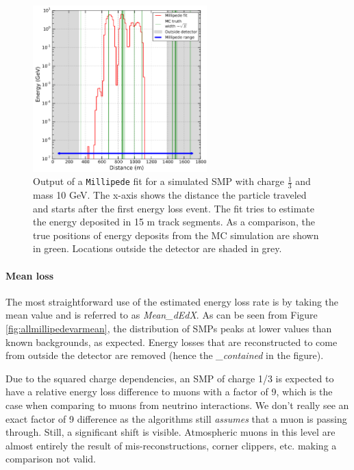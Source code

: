 \begin{figure}
\centering
\includegraphics[width=0.6\textwidth]{chapter8/img/millipedeStef.png}
\caption{Output of a \texttt{Millipede} fit for a simulated SMP with charge $\frac{1}{3}$ and mass 10 GeV. The x-axis shows the distance the particle traveled and starts after the first energy loss event. The fit tries to estimate the energy deposited in 15 m track segments. As a comparison, the true positions of energy deposits from the MC simulation are shown in green. Locations outside the detector are shaded in grey.}
\label{fig:millipedeoutput}
\end{figure}

\paragraph{Mean loss}
The most straightforward use of the estimated energy loss rate is by taking the mean value and is referred to as \textit{Mean\_dEdX}. As can be seen from Figure \ref{fig:allmillipedevarmean}, the distribution of SMPs peaks at lower values than known backgrounds, as expected. Energy losses that are reconstructed to come from outside the detector are removed (hence the \textit{\_contained} in the figure). 

Due to the squared charge dependencies, an SMP of charge 1/3 is expected to have a relative energy loss difference to muons with a factor of 9, which is the case when comparing to muons from neutrino interactions. We don't really see an exact factor of 9 difference as the algorithms still \textit{assumes} that a muon is passing through. Still, a significant shift is visible. Atmospheric muons in this level are almost entirely the result of mis-reconstructions, corner clippers, etc. making a comparison not valid.

